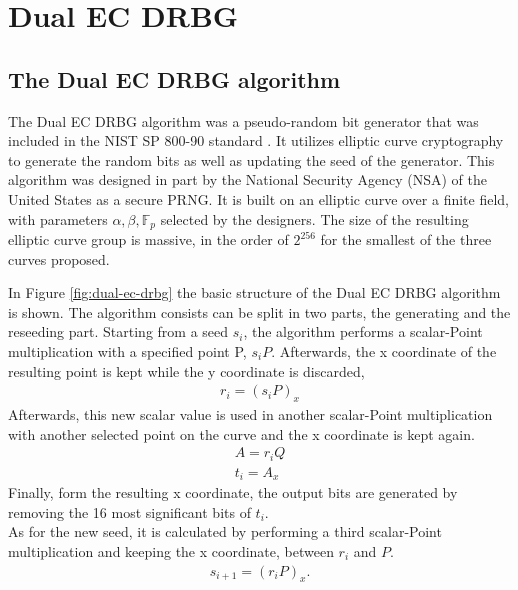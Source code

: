 \section{Dual EC DRBG}

\subsection{The Dual EC DRBG algorithm}

The Dual EC DRBG algorithm was a pseudo-random bit generator that was included in the NIST SP 800-90 standard \cite{nist-sp800-90}. It utilizes elliptic curve cryptography to generate the random bits as well as updating the seed of the generator. This algorithm was designed in part by the National Security Agency (NSA) of the United States as a secure PRNG. It is built on an elliptic curve over a finite field, with parameters $\alpha, \beta, \mathbb{F}_p$ selected by the designers. The size of the resulting elliptic curve group is massive, in the order of $2^256$ for the smallest of the three curves proposed.
\\


In Figure \ref{fig:dual-ec-drbg} the basic structure of the Dual EC DRBG algorithm is shown. The algorithm consists can be split in two parts, the generating and the reseeding part. Starting from a seed $s_i$, the algorithm performs a scalar-Point multiplication with a specified point P, $s_iP$. Afterwards, the x coordinate of the resulting point is kept while the y coordinate is discarded, 
\begin{gather}
    r_i = {(s_iP)}_x    
\end{gather}
Afterwards, this new scalar value is used in another scalar-Point multiplication with another selected point on the curve and the x coordinate is kept again.
\begin{gather}
    A = r_iQ \\
    t_i = A_{x}
\end{gather}
Finally, form the resulting x coordinate, the output bits are generated by removing the 16 most significant bits of $t_i$. 
\\

\noindent
As for the new seed, it is calculated by performing a third scalar-Point multiplication and keeping the x coordinate, between $r_i$ and $P$.
\begin{gather}
    s_{i+1} = {(r_iP)}_x.
\end{gather}

